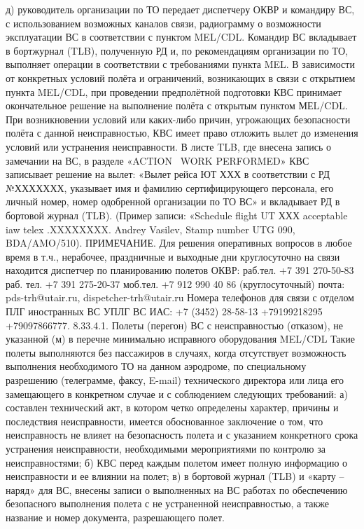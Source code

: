 д)	руководитель организации по ТО передает диспетчеру ОКВР и командиру ВС, с использованием возможных каналов связи, радиограмму о возможности эксплуатации ВС в соответствии с пунктом MEL/CDL.
Командир ВС вкладывает в бортжурнал (TLB), полученную РД и, по рекомендациям организации по ТО, выполняет операции в соответствии с требованиями пункта MEL.
В зависимости от конкретных условий полёта и ограничений, возникающих в связи с открытием пункта MEL/CDL, при проведении предполётной подготовки КВС принимает окончательное решение на выполнение полёта с открытым пунктом МЕL/CDL. При возникновении условий или каких-либо причин, угрожающих безопасности полёта с данной неисправностью, КВС имеет право отложить вылет до изменения условий или устранения неисправности.
В листе TLB, где внесена запись о замечании на ВС, в разделе «ACTION \ WORK PERFORMED» КВС записывает решение на вылет: «Вылет рейса ЮТ ХХХ в соответствии с РД №ХХХХХХХ, указывает имя и фамилию сертифицирующего персонала, его личный номер, номер одобренной организации по ТО ВС» и вкладывает РД в бортовой журнал (TLB).
 (Пример записи: «Schedule flight UT ХХХ acceptable iaw telex .XXXXXXXX. Andrey Vasilev, Stamp number UTG 090, BDA/AMO/510).
ПРИМЕЧАНИЕ. Для решения оперативных вопросов в любое время в т.ч., нерабочее, праздничные и выходные дни круглосуточно на связи находится диспетчер по планированию полетов ОКВР:
раб.тел. +7 391 270-50-83
раб. тел. +7 391 275-20-37
моб.тел. +7 912 990 40 86 (круглосуточный)
почта: pds-trh@utair.ru, dispetcher-trh@utair.ru
Номера телефонов для связи с отделом ПЛГ иностранных ВС УПЛГ ВС ИАС: 
+7 (3452) 28-58-13
+79199218295
+79097866777. 
8.33.4.1.	Полеты (перегон) ВС с неисправностью (отказом), не указанной (м) в перечне минимально исправного оборудования MEL/CDL
Такие полеты выполняются без пассажиров в случаях, когда отсутствует возможность выполнения необходимого ТО на данном аэродроме, по специальному разрешению (телеграмме, факсу, E-mail) технического директора или лица его замещающего в конкретном случае и с соблюдением следующих требований:
а)	составлен технический акт, в котором четко определены характер, причины и последствия неисправности, имеется обоснованное заключение о том, что неисправность не влияет на безопасность полета и с указанием конкретного срока устранения неисправности, необходимыми мероприятиями по контролю за неисправностями;
б)	КВС перед каждым полетом имеет полную информацию о неисправности и ее влиянии на полет;
в)	в бортовой журнал (TLB) и «карту – наряд» для ВС, внесены записи о выполненных на ВС работах по обеспечению безопасного выполнения полета с не устраненной неисправностью, а также название и номер документа, разрешающего полет.
